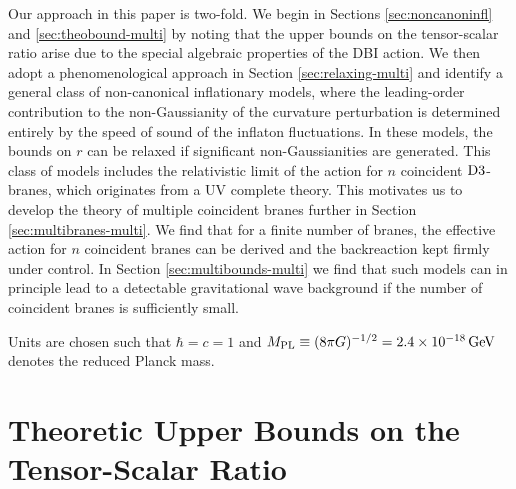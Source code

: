 Our approach in this paper is two-fold. We 
begin in Sections \ref{sec:noncanoninfl} and \ref{sec:theobound-multi} 
by noting that the upper bounds on the tensor-scalar ratio arise due to the
special algebraic properties of the DBI action. We 
then adopt a phenomenological approach in Section \ref{sec:relaxing-multi}
and identify a general class of non-canonical inflationary models, 
where the leading-order contribution to the non-Gaussianity of the 
curvature perturbation is determined 
entirely by the speed of sound of the inflaton fluctuations. 
In these models, the bounds on $r$ can be relaxed 
if significant non-Gaussianities are generated.  
This class of models includes the relativistic limit  
of the action for $n$ coincident ${\rm D3}$-branes, 
which originates from a UV complete theory. This motivates us 
to develop the theory of multiple coincident branes further in Section
\ref{sec:multibranes-multi}. We find that for a finite number of branes, 
the effective action for $n$ coincident branes can be derived and the backreaction
kept firmly under control.
In Section \ref{sec:multibounds-multi} we find that such models 
can in principle lead to a detectable 
gravitational wave background if 
the number of coincident branes is sufficiently small. 


Units are chosen such that $\hbar = c =1$ and $M_{\mathrm{PL}} \equiv (8\pi G)^{-1/2}
= 2.4 \times 10^{-18} \, {\rm GeV}$ denotes the 
reduced Planck mass. 


% 
% 
\section{Theoretic Upper Bounds on the Tensor-Scalar Ratio}
\label{sec:theobound-multi}

